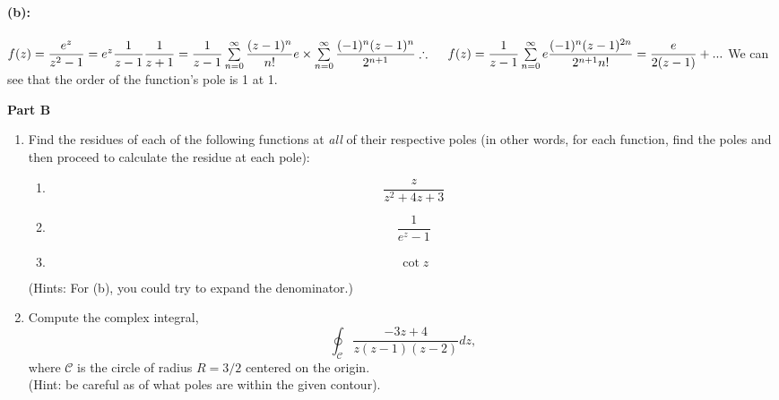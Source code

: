 \documentclass[fleqn]{article}
\begin{document}
\begin{enumerate}
{        \\
        \\
        \textbf{(b):}
        \\
        \\
        $
          f(z)=\dfrac{e^z}{z^2-1}=e^z \dfrac{1}{z-1} \dfrac{1}{z+1}
          \\
          \\
          =\dfrac{1}{z-1} \sum\limits_{n=0}^{\infty} \dfrac{(z-1)^n}{n!} e \times \sum\limits_{n=0}^{\infty} \dfrac{(-1)^n (z-1)^n}{2^{n+1}}
          \\
          \\
          \\
          \therefore ~~~~ f(z)=\dfrac{1}{z-1} \sum\limits_{n=0}^{\infty} e \dfrac{(-1)^n (z-1)^{2n}}{2^{n+1} n!}=\dfrac{e}{2(z-1)}+...
        $
        We can see that the order of the function's pole is 1 at 1.
      }

  \end{enumerate}

  \pagebreak

  \textbf{Part B}
  \begin{enumerate}

    \item Find the residues of each of the following functions at \emph{all} of their respective poles (in other words, for each function, find the poles and then proceed to calculate the residue at each pole):
    \begin{enumerate}
      \item $$\frac{z}{z^2 + 4z + 3}$$
      
      \item $$\frac{1}{e^z - 1}$$
      
      \item $$\cot z$$
    \end{enumerate}
    (Hints:  For (b), you could try to expand the denominator.) 
    
    
    \item Compute the complex integral,
    $$ \oint_{\mathcal C} \frac{-3z + 4}{z(z-1)(z-2)} dz ,$$
    where ${\mathcal C}$ is the circle of radius $R=3/2$ centered on the origin. \\
    (Hint:  be careful as of what poles are within the given contour). 
    
  \end{enumerate}
\end{document}
